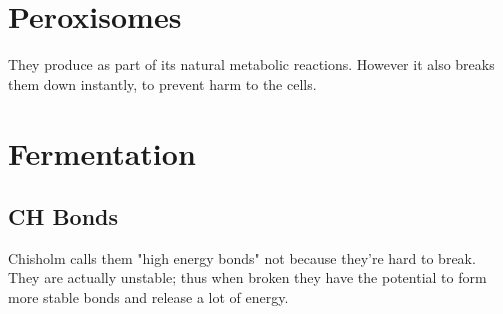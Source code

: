 \documentclass[12pt]{article}
\begin{document}
\section{Peroxisomes}
They produce  as part of its natural metabolic reactions.
However it also breaks them down instantly, to prevent
harm to the cells. 

\section{Fermentation}

\subsection{CH Bonds}
Chisholm calls them "high energy bonds" not because they're hard to break.
They are actually unstable; thus when broken they have the potential
to form more stable bonds and release a lot of energy. 
\end{document}
